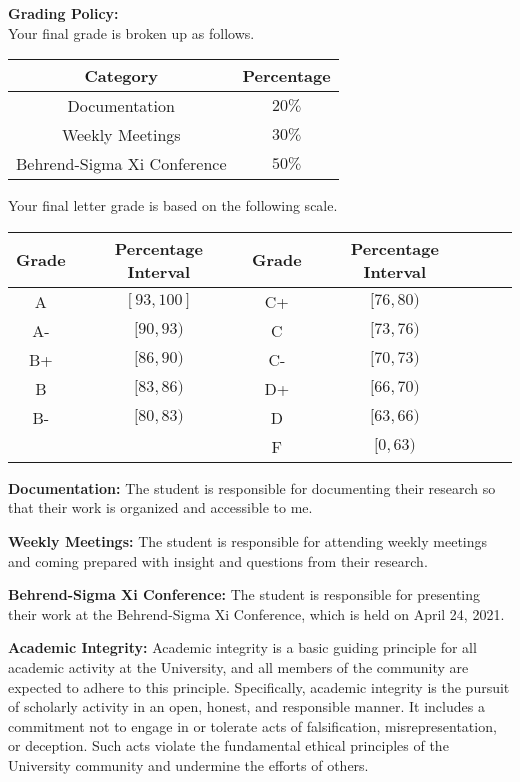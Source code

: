 \documentclass[11pt]{article}
\begin{document}
\newpage
\noindent\textbf{Grading Policy:}~\\
Your final grade is broken up as follows. 
\begin{center}
\begin{tabular}{|cc|}
\hline
Category & Percentage\\
\hline
Documentation & $20\%$\\
Weekly Meetings & $30\%$\\
Behrend-Sigma Xi Conference & $50\%$\\
\hline
\end{tabular}
\end{center}

Your final letter grade is based on the following scale.
\begin{center}
\begin{tabular}{|cc | cc | cc|}
  \hline
  Grade & Percentage Interval & Grade & Percentage Interval\\
  \hline
  A & $[93,100]$ & C+ & $[76,80)$\\
  A- & $[90,93)$ & C & $[73,76)$ \\
  B+ & $[86,90)$ & C- & $[70,73)$\\
  B & $[83,86)$ & D+ & $[66,70)$\\
  B- & $[80,83)$ & D & $[63,66)$\\
     &           & F & $[0,63)$\\
  \hline
\end{tabular}
\end{center}

\vspace*{.10in}
\noindent\textbf{Documentation:}
The student is responsible for documenting their research so that their work is organized and accessible to me.

\vspace*{.10in}
\noindent\textbf{Weekly Meetings:}
The student is responsible for attending weekly meetings and coming prepared with insight and questions from their research.

\vspace*{.10in}
\noindent\textbf{Behrend-Sigma Xi Conference:}
The student is responsible for presenting their work at the Behrend-Sigma Xi Conference, which is held on April 24, 2021.

\vspace*{.10in}
\noindent\textbf{Academic Integrity:}
Academic integrity is a basic guiding principle for all academic activity at the University, and all members of the community are expected to adhere to this principle. Specifically, academic integrity is the pursuit of scholarly activity in an open, honest, and responsible manner. It includes a commitment not to engage in or tolerate acts of falsification, misrepresentation, or deception. Such acts violate the fundamental ethical principles of the University community and undermine the efforts of others.
\end{document}
